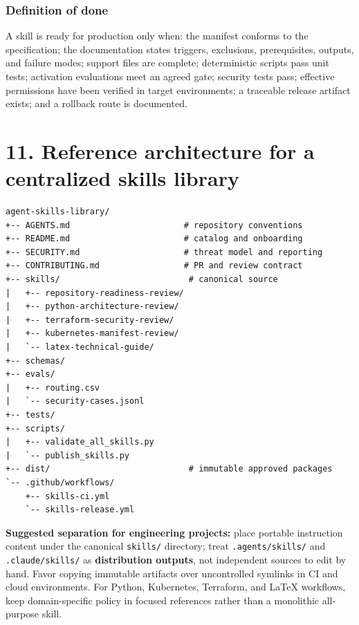 \documentclass[
  10pt,
  letterpaper,
]{article}
\newcommand{\passthrough}[1]{#1}
\begin{document}
\subsubsection{Definition of done}\label{definition-of-done}

A skill is ready for production only when: the manifest conforms to the
specification; the documentation states triggers, exclusions,
prerequisites, outputs, and failure modes; support files are complete;
deterministic scripts pass unit tests; activation evaluations meet an
agreed gate; security tests pass; effective permissions have been
verified in target environments; a traceable release artifact exists;
and a rollback route is documented.

\section{11. Reference architecture for a centralized skills
library}\label{reference-architecture-for-a-centralized-skills-library}

\begin{lstlisting}
agent-skills-library/
+-- AGENTS.md                       # repository conventions
+-- README.md                       # catalog and onboarding
+-- SECURITY.md                     # threat model and reporting
+-- CONTRIBUTING.md                 # PR and review contract
+-- skills/                          # canonical source
|   +-- repository-readiness-review/
|   +-- python-architecture-review/
|   +-- terraform-security-review/
|   +-- kubernetes-manifest-review/
|   `-- latex-technical-guide/
+-- schemas/
+-- evals/
|   +-- routing.csv
|   `-- security-cases.jsonl
+-- tests/
+-- scripts/
|   +-- validate_all_skills.py
|   `-- publish_skills.py
+-- dist/                            # immutable approved packages
`-- .github/workflows/
    +-- skills-ci.yml
    `-- skills-release.yml
\end{lstlisting}

\textbf{Suggested separation for engineering projects:} place portable
instruction content under the canonical
\passthrough{\lstinline!skills/!} directory; treat
\passthrough{\lstinline!.agents/skills/!} and
\passthrough{\lstinline!.claude/skills/!} as \textbf{distribution
outputs}, not independent sources to edit by hand. Favor copying
immutable artifacts over uncontrolled symlinks in CI and cloud
environments. For Python, Kubernetes, Terraform, and LaTeX workflows,
keep domain-specific policy in focused references rather than a
monolithic all-purpose skill.
\end{document}

